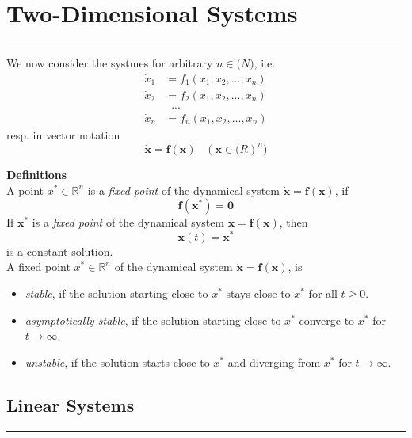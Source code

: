 \section{Two-Dimensional Systems}
\noindent\rule[\linienAbstand]{\linewidth}{\linienDickeDick}
We now consider the systmes for arbitrary $n \in \mathbb(N)$, i.e.
\begin{equation}
  \begin{split}
    \dot{x}_1 &= f_1(x_1, x_2,...,x_n)\\
    \dot{x}_2 &= f_2(x_1, x_2,...,x_n)\\
     &\;\;...\\
    \dot{x}_n &= f_n(x_1, x_2,...,x_n)
  \end{split}
\end{equation}
resp. in vector notation
\begin{equation}
  \dot{\mathbf{x}} = \mathbf{f}(\mathbf{x}) \;\;\; (\mathbf{x}\in\mathbb(R)^n)
\end{equation}



\textbf{Definitions}\\
A point $x^* \in \mathbb{R}^n$ is a \emph{fixed point} of the dynamical system $\dot{\mathbf{x}} =  \mathbf{f}(\mathbf{x})$, if
\begin{equation}
  \mathbf{f}(\mathbf{x^*}) = \mathbf{0}
\end{equation}
If $\mathbf{x^*}$ is a \emph{fixed point} of the dynamical system $\dot{\mathbf{x}} =  \mathbf{f}(\mathbf{x})$, then
\begin{equation}
   \mathbf{x}(t) =  \mathbf{x}^*
\end{equation}
is a constant solution.\\

A fixed point $x^* \in \mathbb{R}^n$ of the dynamical system $\dot{\mathbf{x}} =  \mathbf{f}(\mathbf{x})$, is
\begin{itemize}
  \item \emph{stable}, if the solution starting close to $x^*$ stays close to $x^*$ for all $t \geq 0$.
  \item \emph{asymptotically stable}, if the solution starting close to $x^*$ converge to $x^*$ for $t \rightarrow \infty$.
  \item \emph{unstable}, if the solution starts close to $x^*$ and diverging from $x^*$ for $t \rightarrow \infty$.
\end{itemize}

\subsection{Linear Systems}
\noindent\rule[\linienAbstand]{\linewidth}{\linienDicke}

